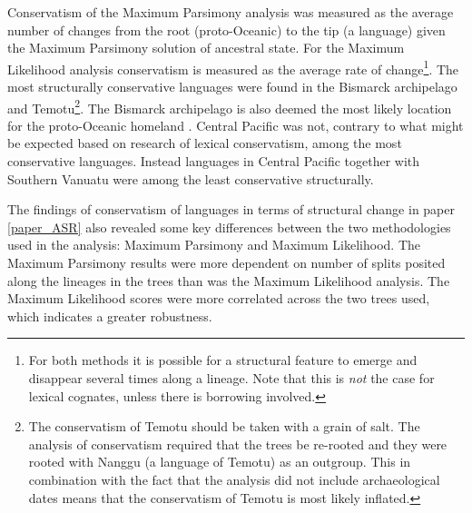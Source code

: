 \documentclass[draft,10pt]{article} %
\begin{document}
Conservatism of the Maximum Parsimony analysis was measured as the average number of changes from the root (proto-Oceanic) to the tip (a language) given the Maximum Parsimony solution of ancestral state. For the Maximum Likelihood analysis conservatism is measured as the average rate of change\footnote{For both methods it is possible for a structural feature to emerge and disappear several times along a lineage. Note that this is \emph{not} the case for lexical cognates, unless there is borrowing involved.}. The most structurally conservative languages were found in the Bismarck archipelago and Temotu\footnote{The conservatism of Temotu should be taken with a grain of salt. The analysis of conservatism required that the trees be re-rooted and they were rooted with Nanggu (a language of Temotu) as an outgroup. This in combination with the fact that the analysis did not include archaeological dates means that the conservatism of Temotu is most likely inflated.}. The Bismarck archipelago is also deemed the most likely location for the proto-Oceanic homeland \citep[97]{lynchrosscrowleyinternalsubgroupingoceanic}. Central Pacific was not, contrary to what might be expected based on research of lexical conservatism, among the most conservative languages. Instead languages in Central Pacific together with Southern Vanuatu were among the least conservative structurally.

The findings of conservatism of languages in terms of structural change in paper \ref{paper_ASR} also revealed some key differences between the two methodologies used in the analysis: Maximum Parsimony and Maximum Likelihood. The Maximum Parsimony results were more dependent on number of splits posited along the lineages in the trees than was the Maximum Likelihood analysis. The Maximum Likelihood scores were more correlated across the two trees used, which indicates a greater robustness.
\end{document}
